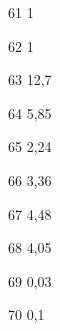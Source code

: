 \begin{loigiaibt}{61}
 1
\end{loigiaibt}
\begin{loigiaibt}{62}
 1
\end{loigiaibt}
\begin{loigiaibt}{63}
 12{,}7
\end{loigiaibt}
\begin{loigiaibt}{64}
 5{,}85
\end{loigiaibt}
\begin{loigiaibt}{65}
 2{,}24
\end{loigiaibt}
\begin{loigiaibt}{66}
 3{,}36
\end{loigiaibt}
\begin{loigiaibt}{67}
 4{,}48
\end{loigiaibt}
\begin{loigiaibt}{68}
 4{,}05
\end{loigiaibt}
\begin{loigiaibt}{69}
 0{,}03
\end{loigiaibt}
\begin{loigiaibt}{70}
 0{,}1
\end{loigiaibt}
